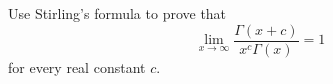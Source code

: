 \begin{exercise}
	Use Stirling's formula to prove that
	\begin{equation*}
	\lim\limits_{x \to \infty} \frac{\Gamma \left( x + c \right)}{x^c \Gamma \left( x \right)} = 1
	\end{equation*}
	for every real constant $c$.
\end{exercise}
